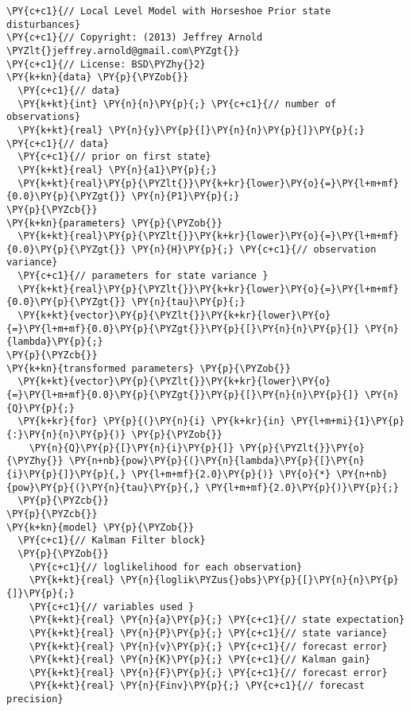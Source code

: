 \begin{Verbatim}[commandchars=\\\{\}]
\PY{c+c1}{// Local Level Model with Horseshoe Prior state disturbances}
\PY{c+c1}{// Copyright: (2013) Jeffrey Arnold \PYZlt{}jeffrey.arnold@gmail.com\PYZgt{}}
\PY{c+c1}{// License: BSD\PYZhy{}2}
\PY{k+kn}{data} \PY{p}{\PYZob{}}
  \PY{c+c1}{// data}
  \PY{k+kt}{int} \PY{n}{n}\PY{p}{;} \PY{c+c1}{// number of observations}
  \PY{k+kt}{real} \PY{n}{y}\PY{p}{[}\PY{n}{n}\PY{p}{]}\PY{p}{;} \PY{c+c1}{// data}
  \PY{c+c1}{// prior on first state}
  \PY{k+kt}{real} \PY{n}{a1}\PY{p}{;}
  \PY{k+kt}{real}\PY{p}{\PYZlt{}}\PY{k+kr}{lower}\PY{o}{=}\PY{l+m+mf}{0.0}\PY{p}{\PYZgt{}} \PY{n}{P1}\PY{p}{;}
\PY{p}{\PYZcb{}}
\PY{k+kn}{parameters} \PY{p}{\PYZob{}}
  \PY{k+kt}{real}\PY{p}{\PYZlt{}}\PY{k+kr}{lower}\PY{o}{=}\PY{l+m+mf}{0.0}\PY{p}{\PYZgt{}} \PY{n}{H}\PY{p}{;} \PY{c+c1}{// observation variance}
  \PY{c+c1}{// parameters for state variance }
  \PY{k+kt}{real}\PY{p}{\PYZlt{}}\PY{k+kr}{lower}\PY{o}{=}\PY{l+m+mf}{0.0}\PY{p}{\PYZgt{}} \PY{n}{tau}\PY{p}{;} 
  \PY{k+kt}{vector}\PY{p}{\PYZlt{}}\PY{k+kr}{lower}\PY{o}{=}\PY{l+m+mf}{0.0}\PY{p}{\PYZgt{}}\PY{p}{[}\PY{n}{n}\PY{p}{]} \PY{n}{lambda}\PY{p}{;}
\PY{p}{\PYZcb{}}
\PY{k+kn}{transformed parameters} \PY{p}{\PYZob{}}
  \PY{k+kt}{vector}\PY{p}{\PYZlt{}}\PY{k+kr}{lower}\PY{o}{=}\PY{l+m+mf}{0.0}\PY{p}{\PYZgt{}}\PY{p}{[}\PY{n}{n}\PY{p}{]} \PY{n}{Q}\PY{p}{;}
  \PY{k+kr}{for} \PY{p}{(}\PY{n}{i} \PY{k+kr}{in} \PY{l+m+mi}{1}\PY{p}{:}\PY{n}{n}\PY{p}{)} \PY{p}{\PYZob{}}
    \PY{n}{Q}\PY{p}{[}\PY{n}{i}\PY{p}{]} \PY{p}{\PYZlt{}}\PY{o}{\PYZhy{}} \PY{n+nb}{pow}\PY{p}{(}\PY{n}{lambda}\PY{p}{[}\PY{n}{i}\PY{p}{]}\PY{p}{,} \PY{l+m+mf}{2.0}\PY{p}{)} \PY{o}{*} \PY{n+nb}{pow}\PY{p}{(}\PY{n}{tau}\PY{p}{,} \PY{l+m+mf}{2.0}\PY{p}{)}\PY{p}{;}
  \PY{p}{\PYZcb{}}
\PY{p}{\PYZcb{}}
\PY{k+kn}{model} \PY{p}{\PYZob{}}
  \PY{c+c1}{// Kalman Filter block}
  \PY{p}{\PYZob{}}
    \PY{c+c1}{// loglikelihood for each observation}
    \PY{k+kt}{real} \PY{n}{loglik\PYZus{}obs}\PY{p}{[}\PY{n}{n}\PY{p}{]}\PY{p}{;}
    \PY{c+c1}{// variables used }
    \PY{k+kt}{real} \PY{n}{a}\PY{p}{;} \PY{c+c1}{// state expectation}
    \PY{k+kt}{real} \PY{n}{P}\PY{p}{;} \PY{c+c1}{// state variance}
    \PY{k+kt}{real} \PY{n}{v}\PY{p}{;} \PY{c+c1}{// forecast error}
    \PY{k+kt}{real} \PY{n}{K}\PY{p}{;} \PY{c+c1}{// Kalman gain}
    \PY{k+kt}{real} \PY{n}{F}\PY{p}{;} \PY{c+c1}{// forecast error}
    \PY{k+kt}{real} \PY{n}{Finv}\PY{p}{;} \PY{c+c1}{// forecast precision}
    

\end{Verbatim}
